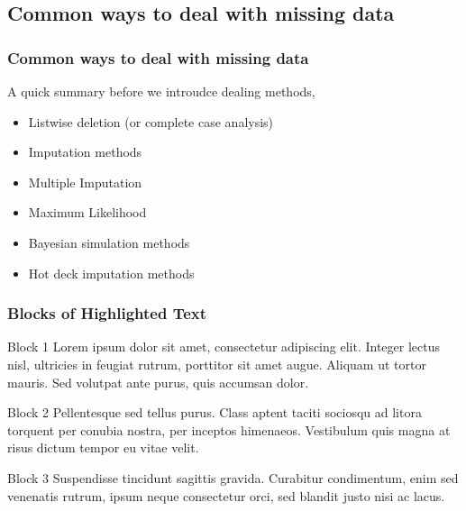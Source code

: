 \documentclass{beamer}
\begin{document}
\subsection{Common ways to deal with missing data}
\fontsize{11pt}{7.2}\selectfont
\begin{frame}
\frametitle{Common ways to deal with missing data}
A quick summary before we introudce dealing methods, \cite{p3}\\
	\begin{itemize}
		\item Listwise deletion (or complete case analysis)
		\item Imputation methods
		\item Multiple Imputation
		\item Maximum Likelihood 
		\item Bayesian simulation methods
		\item Hot deck imputation methods
	\end{itemize}
\end{frame}
\begin{frame}
\frametitle{Blocks of Highlighted Text}
\begin{block}{Block 1}
Lorem ipsum dolor sit amet, consectetur adipiscing elit. Integer lectus nisl, ultricies in feugiat rutrum, porttitor sit amet augue. Aliquam ut tortor mauris. Sed volutpat ante purus, quis accumsan dolor.
\end{block}

\begin{block}{Block 2}
Pellentesque sed tellus purus. Class aptent taciti sociosqu ad litora torquent per conubia nostra, per inceptos himenaeos. Vestibulum quis magna at risus dictum tempor eu vitae velit.
\end{block}

\begin{block}{Block 3}
Suspendisse tincidunt sagittis gravida. Curabitur condimentum, enim sed venenatis rutrum, ipsum neque consectetur orci, sed blandit justo nisi ac lacus.
\end{block}
\end{frame}

\end{document}
